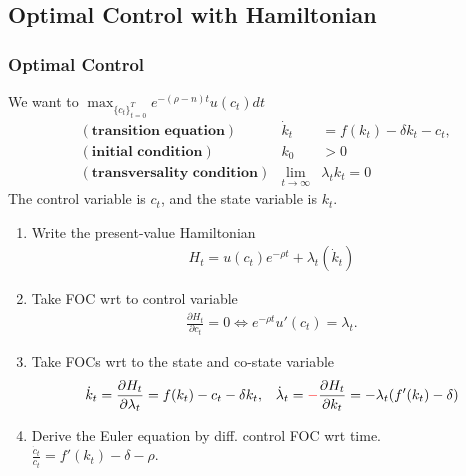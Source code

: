 \documentclass[
10pt, %
]{beamer}
\newcommand{\red}[1]{\textcolor{red}{#1}}
\begin{document}
\subsection{Optimal Control with Hamiltonian}
\begin{frame}
	\frametitle{Optimal Control}
	We want to $\max_{ \{c_t\}^T_{t=0} } e^{-(\rho-n) t} u(c_t)  dt$
	\begin{align*}
		&(\textbf{transition equation}) & \dot{k}_t &= f(k_t) - \delta k_t - c_t, \\
		&(\textbf{initial condition}) & k_0 &> 0 \\
		&(\textbf{transversality condition}) & \lim_{t\to\infty} &\lambda_t k_t = 0
	\end{align*}
	The control variable is $c_t$, and the state variable is $k_t$.
	\begin{enumerate}
		\item Write the present-value Hamiltonian
		\begin{align*}
			H_t = u(c_t)e^{-\rho t} + \lambda_t (\dot{k}_t)
		\end{align*}
		\item Take FOC wrt to control variable
		\begin{align*}
			\frac{\partial H_t}{\partial c_t} = 0 \Leftrightarrow e^{-\rho t} u'(c_t) = \lambda_t.
		\end{align*}
		\item Take FOCs wrt to the state and co-state variable
		\begin{align*}
			\dot{k}_t = \frac{\partial H_t}{\partial \lambda_t} = f(k_t) - c_t - \delta k_t, &&
			\dot{\lambda}_t = \red{-} \frac{\partial H_t}{\partial k_t} = - \lambda_t (f'(k_t) - \delta)
		\end{align*}
		\item Derive the Euler equation by diff. control FOC wrt time. $\frac{\dot{c}_t}{c_t} = f'(k_t) - \delta - \rho. $
	\end{enumerate}
\end{frame}
\end{document}
